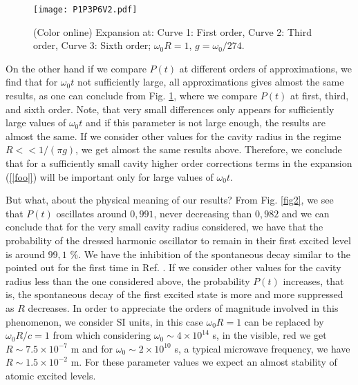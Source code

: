 \documentclass[10pt,english,twocolumn]{revtex4}
\begin{document}
\begin{figure}[b!]
\texttt{[image: P1P3P6V2.pdf]}
 \caption{(Color online) Expansion at: Curve 1: First order, Curve 2: Third order, Curve 3: Sixth order; $\omega_0R=1$, $g=\omega_0/274$.}
\label{fig3} 
\end{figure} 
On the other hand if we compare
$P(t)$ at different orders of approximations, we find that for $\omega_0 t$ not sufficiently large, all approximations
gives almost the same results, as one can conclude from Fig. \ref{fig3}, where we compare $P(t)$ at first, third, and
sixth order. Note, that very small differences only appears for sufficiently large values of $\omega_0 t$ and if this parameter
is not large enough, the results are almost the same. If we consider other values for the cavity radius in the regime $R<<1/(\pi g)$,
we get almost the same results above.
Therefore, we conclude that for a sufficiently small cavity
higher order corrections terms in the expansion (\ref{|foo|}) will be important only for large values of $\omega_0 t$. 

But what, about the physical meaning of our results? From
Fig. \ref{fig2}, we see that $P(t)$ oscillates around $0,991$, never decreasing than $0,982$ and we can conclude 
 that for the very small cavity radius considered, we have that the probability of the dressed harmonic oscillator 
to remain in their first excited level is around $99,1$ \%. We have the inhibition  of the spontaneous decay similar to the pointed
out for the first time in Ref. \cite{Kleppner}. If we consider other values for the cavity radius less than the one considered above,
the probability $P(t)$ increases, that is, the spontaneous decay of the first excited state is more and more suppressed as $R$ decreases.  
In order to appreciate the orders of magnitude involved in this phenomenon, we consider SI units, in this case $\omega_0  R=1$
can be replaced by $\omega_0 R/c=1$ from which considering $\omega_0\sim4\times 10^{14}$ s, in the visible, red we get
$R\sim 7.5 \times 10^{-7}$ m and for $\omega_0\sim 2\times 10^{10}$ s, a typical microwave frequency, we have 
$R\sim 1.5\times 10^{-2}$ m. For these parameter values we expect an almost stability of atomic excited levels.

\end{document}
